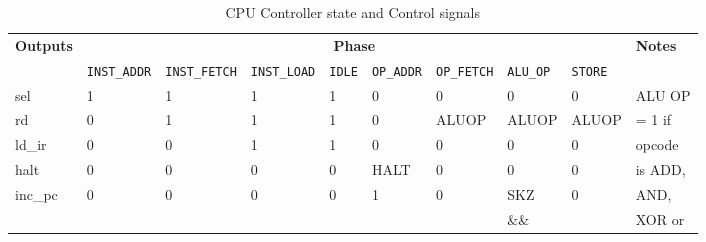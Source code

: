 \begin{table}[H]
	\caption{CPU Controller state and Control signals}
	\begin{center}
		\resizebox{\textwidth}{!} {
			\begin{tabular}[h]{|l|l|l|l|l|l|l|l|l|l|}
				\hline
				\multirow{2}{*}{\textbf{Outputs}} & \multicolumn{8}{c|}{\textbf{Phase}} & \multirow{2}{*}{\textbf{Notes}}                                                                                                                                        \\ \cline{2-9}
				                                  & \texttt{INST\_ADDR}                 & \texttt{INST\_FETCH}            & \texttt{INST\_LOAD} & \texttt{IDLE}      & \texttt{OP\_ADDR}  & \texttt{OP\_FETCH} & \texttt{ALU\_OP} & \texttt{STORE}     &         \\ \hline{}
				sel                               & 1                                   & 1                               & 1                   & 1                  & 0                  & 0                  & 0                & 0                  & ALU OP  \\ \cline{1-9}
				rd                                & 0                                   & 1                               & 1                   & 1                  & 0                  & ALUOP              & ALUOP            & ALUOP              & = 1 if  \\ \cline{1-9}
				ld\_ir                            & 0                                   & 0                               & 1                   & 1                  & 0                  & 0                  & 0                & 0                  & opcode  \\ \cline{1-9}
				halt                              & 0                                   & 0                               & 0                   & 0                  & HALT               & 0                  & 0                & 0                  & is ADD, \\ \cline{1-9}
				\multirow{3}{*}{inc\_pc}          & \multirow{3}{*}{0}                  & \multirow{3}{*}{0}              & \multirow{3}{*}{0}  & \multirow{3}{*}{0} & \multirow{3}{*}{1} & \multirow{3}{*}{0} & SKZ              & \multirow{3}{*}{0} & AND,    \\
				                                  &                                     &                                 &                     &                    &                    &                    & \&\&             &                    & XOR or  \\

\end{tabular}}
\end{center}
\end{table}
